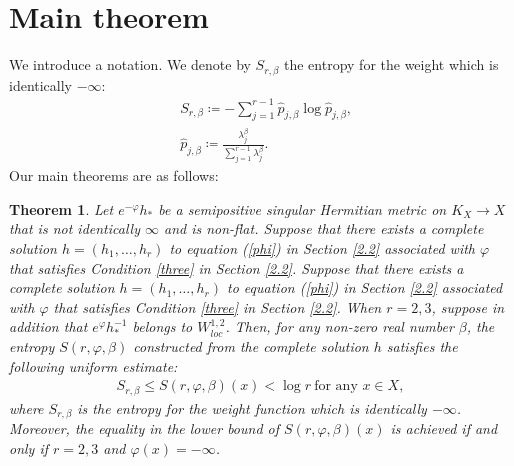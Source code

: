 \documentclass[12pt]{article}
\theoremstyle{definition}
\newtheorem{theo}[defi]{Theorem}
\def\refe{\ast}
\begin{document}
\section{Main theorem}\label{5}
We introduce a notation. We denote by $S_{r,\beta}$ the entropy for the weight which is identically $-\infty$:
\begin{align*}
&S_{r,\beta}\coloneqq -\sum_{j=1}^{r-1} \hat{p}_{j,\beta}\log \hat{p}_{j,\beta}, \\
& \hat{p}_{j,\beta}\coloneqq \frac{\lambda_j^\beta}{\sum_{j=1}^{r-1}\lambda_j^\beta}.
\end{align*}
Our main theorems are as follows:
\begin{theo}\label{main theorem a} {\it Let $e^{-\varphi}h_\refe$ be a semipositive singular Hermitian metric on $K_X\rightarrow X$ that is not identically $\infty$ and is non-flat. Suppose that there exists a complete solution $h=(h_1,\dots, h_r)$ to equation (\ref{phi}) in Section \ref{2.2} associated with $\varphi$ that satisfies Condition \ref{three} in Section \ref{2.2}. Suppose that there exists a complete solution $h=(h_1,\dots, h_r)$ to equation (\ref{phi}) in Section \ref{2.2} associated with $\varphi$ that satisfies Condition \ref{three} in Section \ref{2.2}. When $r=2,3$, suppose in addition that $e^{\varphi}h_\refe^{-1}$ belongs to $W^{1,2}_{loc}$.
Then, for any non-zero real number $\beta$, the entropy $S(r,\varphi, \beta)$ constructed from the complete solution $h$ satisfies the following uniform estimate:
\begin{align*}
S_{r,\beta}\leq S(r,\varphi,\beta)(x)<\log r\ \text{for any $x\in X$},
\end{align*}
where $S_{r,\beta}$ is the entropy for the weight function which is identically $-\infty$. Moreover, the equality in the lower bound of $S(r,\varphi,\beta)(x)$ is achieved if and only if $r=2,3$ and $\varphi(x)=-\infty$. 
}
\end{theo}
\end{document}
